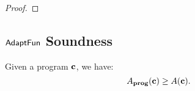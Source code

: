 \begin{proof}

\end{proof}

\subsection{$\textsf{AdaptFun}$ Soundness}
{
  \begin{thm}
    \label{thm:adaptfun_soundness}
  Given a program ${\boldsymbol{\mathbf{c}}}$, we have:
  \[
  A_{\bf{prog}}({\boldsymbol{\mathbf{c}}}) \geq A({\boldsymbol{\mathbf{c}}}).
  \]
  \end{thm}
}

